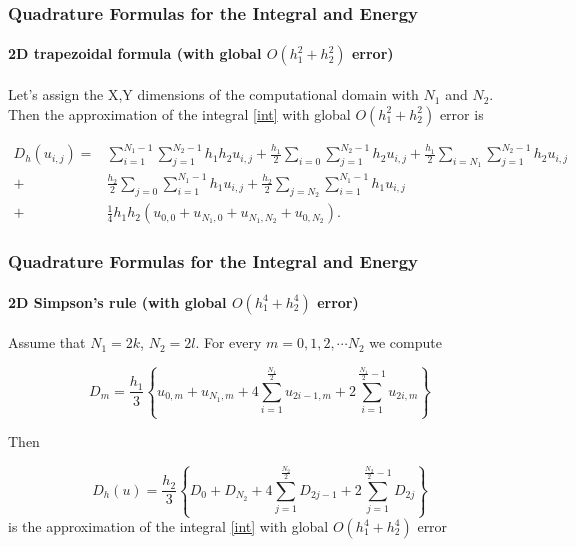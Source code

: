 \documentclass{beamer}
\begin{document}

\begin{frame}
\frametitle{Quadrature Formulas for the Integral and Energy}
\framesubtitle{2D trapezoidal formula (with global $O(h_1^2+h_2^2)$ error)}

Let's assign the X,Y dimensions of the computational domain with $N_1$ and $N_2$.
Then the approximation of the integral \eqref{int} with global $O(h_1^2+h_2^2)$ error is

\begin{align}\label{quadr2}
D_h(u_{i,j}) =& \sum_{i=1}^{N_1-1} \sum_{j=1}^{N_2-1} h_1 h_2 u_{i,j}
+\frac{h_1}{2}\sum_{i=0} \sum_{j=1}^{N_2-1} h_2 u_{i,j}
+\frac{h_1}{2}\sum_{i=N_1} \sum_{j=1}^{N_2-1} h_2 u_{i,j} \nonumber\\
+&\frac{h_2}{2}\sum_{j=0} \sum_{i=1}^{N_1-1} h_1 u_{i,j}
+\frac{h_2}{2}\sum_{j=N_2} \sum_{i=1}^{N_1-1} h_1 u_{i,j}
\nonumber\\
+&\frac{1}{4}h_1 h_2 \left(u_{0,0}+u_{N_1,0}+u_{N_1,N_2}+u_{0,N_2}
\right).
\end{align}

\end{frame}

\begin{frame}
\frametitle{Quadrature Formulas for the Integral and Energy}
\framesubtitle{2D Simpson's rule (with global $O(h_1^4+h_2^4)$ error)}
Assume that $N_1=2k$, $N_2=2 l$.
For every $m=0,1,2,\cdots N_2$ we compute 

$$D_m= \frac{h_1 }{3} 
\left\{ u_{0,m}+u_{N_1,m}+ 4 \sum_{i=1}^{\frac{N_1}{2}}   u_{2i-1,m}
 +2 \sum_{i=1}^{\frac{N_1}{2}-1} u_{2i,m} \right\}$$


Then 

\begin{equation}\label{quadr4}
D_h(u)=\frac{h_2 }{3} 
\left\{ D_{0}+D_{N_2}+ 4 \sum_{j=1}^{\frac{N_2}{2}}   D_{2j-1}
 +2 \sum_{j=1}^{{\frac{N_2}{2}}-1} D_{2j} \right\}
\end{equation}
is the approximation of the integral \eqref{int} with global $O(h_1^4+h_2^4)$ error

\end{frame}

\end{document}
